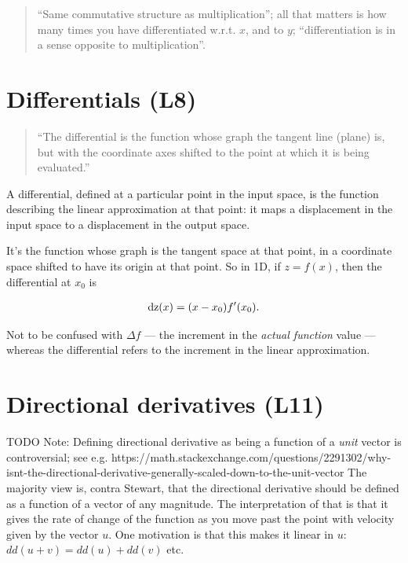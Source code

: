 \begin{quote}
``Same commutative structure as multiplication''; all that matters
is how many times you have differentiated w.r.t. $x$, and to $y$;
``differentiation is in a sense opposite to multiplication''.
\end{quote}

\section{Differentials (L8)}

\begin{quote}
  ``The differential is the function whose graph the tangent line (plane) is,
  but with the coordinate axes shifted to the point at which it is being
  evaluated.''
\end{quote}

A differential, defined at a particular point in the input space, is the
function describing the linear approximation at that point: it maps a
displacement in the input space to a displacement in the output space.

It's the function whose graph is the tangent space at that point, in a
coordinate space shifted to have its origin at that point. So in 1D, if
$z = f(x)$, then the differential at $x_0$ is

\begin{align*}
  \operatorname{\text{dz}}(x) = (x - x_0)f'(x_0).
\end{align*}


Not to be confused with $\Delta f$ --- the increment in the \textit{actual
  function} value --- whereas the differential refers to the increment in the
linear approximation.


\section{Directional derivatives (L11)}

TODO Note: Defining directional derivative as being a function of a \textit{unit}
vector is controversial; see
e.g. https://math.stackexchange.com/questions/2291302/why-isnt-the-directional-derivative-generally-scaled-down-to-the-unit-vector
The majority view is, contra Stewart, that the directional derivative should be
defined as a function of a vector of any magnitude. The interpretation of that
is that it gives the rate of change of the function as you move past the point
with velocity given by the vector $u$. One motivation is that this makes it
linear in $u$: $dd(u + v) = dd(u) + dd(v)$ etc.

